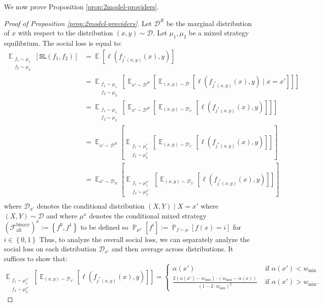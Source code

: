 \documentclass[letterpaper,11pt]{article}
\theoremstyle{plain}
\DeclareMathOperator*{\E}{\mathbb{E}}
\DeclareMathOperator*{\Prob}{\mathbb{P}}
\begin{document}
We now prove Proposition \ref{prop:2model-providers}.
\begin{proof}[Proof of Proposition \ref{prop:2model-providers}]
Let $\mathcal{D}^R$ be the marginal distribution of $x$ with respect to the distribution $(x,y) \sim \mathcal{D}$. 
Let $\mu_1, \mu_2$ be a mixed strategy equilibrium. The social loss is equal to:
\begin{align*}
 \E_{\substack{f_1 \sim \mu_1 \\ f_2 \sim \mu_2}}[\texttt{SL}(f_1, f_2)] &= \E[\ell(f_{j^*(x,y)}(x), y)] \\
 &= \E_{\substack{f_1 \sim \mu_1 \\ f_2 \sim \mu_2}}\left[\E_{x' \sim \mathcal{D}^R} \left[\E_{(x,y) \sim \mathcal{D}}[\ell(f_{j^*(x,y)}(x), y) \mid x = x']\right]\right] \\
 &= \E_{\substack{f_1 \sim \mu_1 \\ f_2 \sim \mu_2}}\left[\E_{x' \sim \mathcal{D}^R} \left[ \E_{(x,y) \sim \mathcal{D}_{x'}}[\ell(f_{j^*(x,y)}(x), y)]\right]\right] \\
 &= \E_{x' \sim \mathcal{D}^R} \left[ \E_{\substack{f_1 \sim \mu^*_1 \\ f_2 \sim \mu^*_2}} \left[\E_{(x,y) \sim \mathcal{D}_{x'}}[\ell(f_{j^*(x,y)}(x), y)]\right]\right] \\
 &= \E_{x' \sim \mathcal{D}_X} \left[ \E_{\substack{f_1 \sim \mu^{x'}_1 \\ f_2 \sim \mu^{x'}_2}}\left[\E_{(x,y) \sim  \mathcal{D}_{x'}}[\ell(f_{j^*(x,y)}(x), y)]\right]\right] \\
\end{align*}
where $\mathcal{D}_{x'}$ denotes the conditional distribution $(X,Y) \mid X = x'$ where $(X,Y) \sim \mathcal{D}$ and where $\mu^x$ denotes the conditional mixed strategy $(\mathcal{F}^{\text{binary}}_{\text{all}})^x := \left\{f^0, f^1\right\}$ to be defined so $\Prob_{\mu^x}[f^i] := \Prob_{f \sim \mu}[f(x) = i]$ for $i \in \left\{0,1\right\}$
Thus, to analyze the overall social loss, we can separately analyze the social loss on each distribution $\mathcal{D}_{x'}$ and then average across distributions. It suffices to show that:
\[ \E_{\substack{f_1 \sim \mu^{x'}_1 \\ f_2 \sim \mu^{x'}_2}}\left[\E_{(x,y) \sim \mathcal{D}_{x'}}[\ell(f_{j^*(x,y)}(x), y)]\right] = 
\begin{cases}
 \alpha(x') & \text{ if } \alpha(x') < w_{\text{min}} \\
 \frac{2(\alpha(x') - w_{\text{min}}) \cdot (w_{\text{max}} - \alpha(x))}{(1 - 2 \cdot w_{\text{min}})^2} & \text{ if }\alpha(x') > w_{\text{min}}.
\end{cases}
\]


\end{proof}
\end{document}
